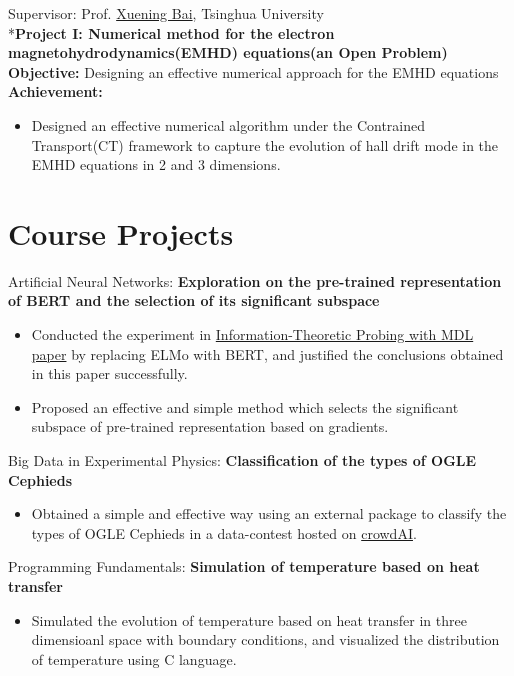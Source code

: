 \documentclass{resume}
\begin{document}
Supervisor: Prof. \href{http://astro.tsinghua.edu.cn/~xbai/}{Xuening Bai}, Tsinghua University
\\*\textbf{Project I: Numerical method for the electron magnetohydrodynamics(EMHD) equations(an Open Problem)}
\textbf{Objective:} Designing an effective numerical approach for the EMHD equations 
\textbf{Achievement:}
\begin{itemize}
    \item Designed an effective numerical algorithm under the Contrained Transport(CT) framework to capture the evolution of hall drift mode in the EMHD equations in 2 and 3 dimensions.
\end{itemize}


\section{Course Projects}
Artificial Neural Networks: \textbf{Exploration on the pre-trained representation of BERT and the selection of its significant subspace}
\begin{itemize}
    \item Conducted the experiment in \href{https://lena-voita.github.io/posts/mdl_probes.html}{Information-Theoretic Probing with MDL paper} by replacing ELMo with BERT, and justified the conclusions obtained in this paper successfully.
    \item Proposed an effective and simple method which selects the significant subspace of pre-trained representation based on gradients.
\end{itemize}

Big Data in Experimental Physics: \textbf{Classification of the types of OGLE Cephieds}
\begin{itemize}
    \item Obtained a simple and effective way using an external package to classify the types of OGLE Cephieds in a data-contest hosted on \href{https://data-contest.applysquare.com/challenges/pd2020}{crowdAI}.
\end{itemize}

Programming Fundamentals: \textbf{Simulation of temperature based on heat transfer}
\begin{itemize}
    \item Simulated the evolution of temperature based on heat transfer in three dimensioanl space with boundary conditions, and visualized the distribution of temperature using C language.
\end{itemize}
\end{document}
